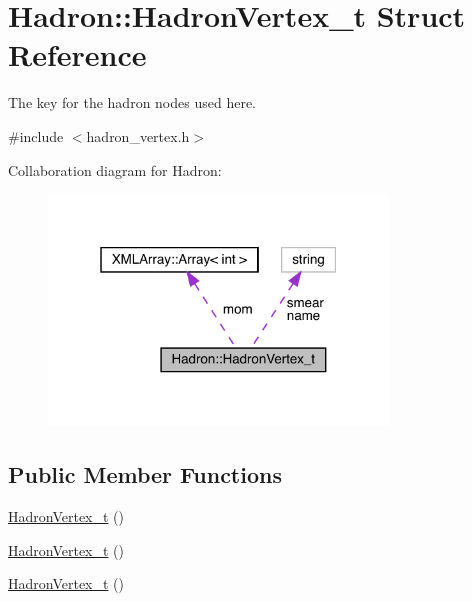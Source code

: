 \hypertarget{structHadron_1_1HadronVertex__t}{}\section{Hadron\+:\+:Hadron\+Vertex\+\_\+t Struct Reference}
\label{structHadron_1_1HadronVertex__t}


The key for the hadron nodes used here.  




{\ttfamily \#include $<$hadron\+\_\+vertex.\+h$>$}



Collaboration diagram for Hadron\+:\nopagebreak
\begin{figure}[H]
\begin{center}
\leavevmode
\includegraphics[width=256pt]{dd/d46/structHadron_1_1HadronVertex__t__coll__graph}
\end{center}
\end{figure}
\subsection*{Public Member Functions}
\begin{DoxyCompactItemize}
\item 
\mbox{\hyperlink{structHadron_1_1HadronVertex__t_ab203b17e0f020c77fc233e70c0466691}{Hadron\+Vertex\+\_\+t}} ()
\item 
\mbox{\hyperlink{structHadron_1_1HadronVertex__t_ab203b17e0f020c77fc233e70c0466691}{Hadron\+Vertex\+\_\+t}} ()
\item 
\mbox{\hyperlink{structHadron_1_1HadronVertex__t_ab203b17e0f020c77fc233e70c0466691}{Hadron\+Vertex\+\_\+t}} ()
\end{DoxyCompactItemize}
